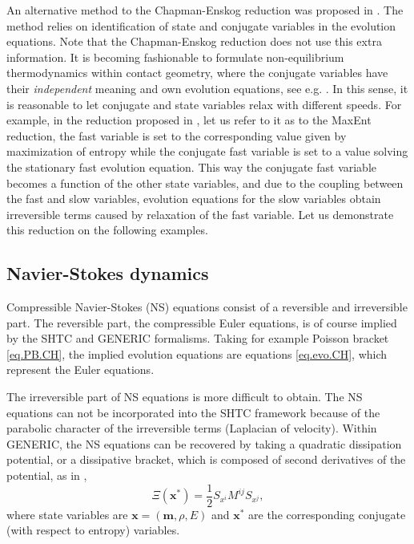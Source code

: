\documentclass[twoside]{article}
\newcommand{\mm}{{\boldsymbol{m}}}
\newcommand{\xx}{{\boldsymbol{x}}}
\newcommand{\ted}{E} %
\newcommand{\IP}[1]{ \textcolor{blue}   {\small\texttt{
\texttt{[image: pin\_small.jpeg]} Ilya: #1}} }
\newcommand{\eps}{\varepsilon}
\begin{document}
An alternative method to the Chapman-Enskog reduction was proposed in 
\cite{PRE15}. The method relies on identification of state and conjugate 
variables in the evolution equations. Note that the Chapman-Enskog reduction 
does not use this extra information. It is becoming fashionable to formulate 
non-equilibrium thermodynamics within contact geometry, where the conjugate 
variables have their \textit{independent} meaning and own evolution equations, 
see e.g. 
\cite{Grmela2014a}. In this sense, it is reasonable to let conjugate and state 
variables relax with different speeds. For example, in the reduction proposed 
in \cite{PRE15}, let us refer to it as to the MaxEnt reduction, the fast 
variable is set to the corresponding value given by maximization of entropy 
while the conjugate fast variable is set to a value solving the stationary fast 
evolution equation. This way the conjugate fast variable becomes a function of 
the other state variables, and due to the coupling between the fast and slow 
variables, evolution equations for the slow variables obtain irreversible terms 
caused by relaxation of the fast variable. Let us demonstrate this reduction on 
the following examples.

\subsection{Navier-Stokes dynamics}\label{sec.NSE}
Compressible Navier-Stokes (NS) equations consist of a reversible and 
irreversible part. The reversible part, the compressible Euler equations, is of 
course implied by the SHTC and GENERIC formalisms. Taking for example Poisson 
bracket \eqref{eq.PB.CH}, the implied evolution equations are equations 
\eqref{eq.evo.CH}, which represent the Euler equations.

The irreversible part of NS equations is more difficult to obtain. The NS 
equations can not be incorporated into the SHTC framework because of the 
parabolic character of the irreversible terms (Laplacian of velocity). 
Within GENERIC, the NS equations can be recovered by taking a quadratic 
dissipation potential, or a dissipative bracket, which is composed of second 
derivatives of the potential, as in \cite{Ottinger-book},
\begin{equation}
\Xi(\xx^*) = \frac{1}{2} S_{x^i} M^{ij} S_{x^j},
\end{equation}
where state variables are $\xx = (\mm, \rho, \ted)$ and $\xx^*$ are the 
corresponding conjugate (with respect to entropy) variables.
\end{document}
